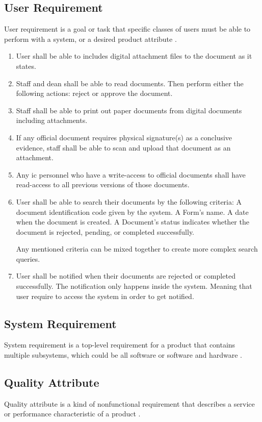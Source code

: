 \subsection{User Requirement}
User requirement is a goal or task that specific classes of users must be able to perform with a system, or a desired product attribute \cite{wiegers_2003}.
\begin{enumerate}
	\item 
	User shall be able to includes digital attachment files to the document as it states.
	
	\item
	Staff and dean shall be able to read documents.
	Then perform either the following actions: reject or approve the document.
	
	\item
	Staff shall be able to print out paper documents from digital documents including attachments.
	
	\item
	If any official document requires physical signature(s) as a conclusive evidence, staff shall be able to scan and upload that document as an attachment.
	
	\item
	Any \gls{ic} personnel who have a write-access to official documents shall have read-access to all previous versions of those documents.
	
	\item
	User shall be able to search their documents by the following criteria:
	\subitem A document identification code given by the system.
	\subitem A Form's name.
	\subitem A date when the document is created.
	\subitem A Document's status indicates whether the document is rejected, pending, or completed successfully.
	
	Any mentioned criteria can be mixed together to create more complex search queries.
	
	\item
	User shall be notified when their documents are rejected or completed successfully.
	The notification only happens inside the system.
	Meaning that user require to access the system in order to get notified.
\end{enumerate}

\subsection{System Requirement}
System requirement is a top-level requirement for a product that contains multiple subsystems, which could be all software or software and hardware \cite{wiegers_2003}.

\subsection{Quality Attribute}
Quality attribute is a kind of nonfunctional requirement that describes a service or performance characteristic of a product \cite{wiegers_2003}.

